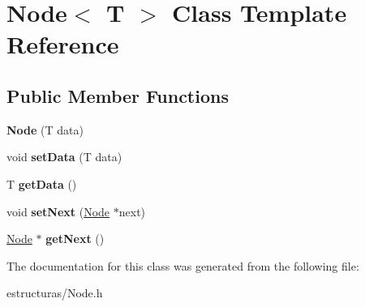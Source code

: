 \hypertarget{classNode}{}\section{Node$<$ T $>$ Class Template Reference}
\label{classNode}
\subsection*{Public Member Functions}
\begin{DoxyCompactItemize}
\item 
\mbox{\label{classNode_a0692b16d246460bf94c18d49592facdd}} 
{\bfseries Node} (T data)
\item 
\mbox{\label{classNode_a3955130f36c0a6d39641dee186caf2a3}} 
void {\bfseries set\+Data} (T data)
\item 
\mbox{\label{classNode_a0c3315ee2e897e2a6e1c24aeca20aeb9}} 
T {\bfseries get\+Data} ()
\item 
\mbox{\label{classNode_ac53cb74d17df1997e438e7f34e7b43f0}} 
void {\bfseries set\+Next} (\hyperlink{classNode}{Node} $\ast$next)
\item 
\mbox{\label{classNode_aaf2b6c875d0972479da9a26fca47db54}} 
\hyperlink{classNode}{Node} $\ast$ {\bfseries get\+Next} ()
\end{DoxyCompactItemize}


The documentation for this class was generated from the following file\+:\begin{DoxyCompactItemize}
\item 
estructuras/Node.\+h\end{DoxyCompactItemize}
